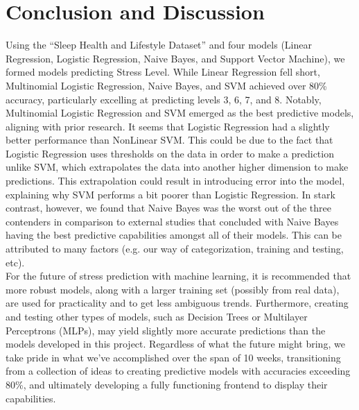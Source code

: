 \documentclass[11pt, letterpaper]{article}
\begin{document}
    \section*{Conclusion and Discussion}
    \noindent Using the “Sleep Health and Lifestyle Dataset” and four models (Linear Regression, Logistic Regression, Naive Bayes, and Support Vector Machine), we formed models predicting Stress Level. While Linear Regression fell short, Multinomial Logistic Regression, Naive Bayes, and SVM achieved over 80\% accuracy, particularly excelling at predicting levels 3, 6, 7, and 8. Notably, Multinomial Logistic Regression and SVM emerged as the best predictive models, aligning with prior research. It seems that Logistic Regression had a slightly better performance than NonLinear SVM. This could be due to the fact that Logistic Regression uses thresholds on the data in order to make a prediction unlike SVM, which extrapolates the data into another higher dimension to make predictions. This extrapolation could result in introducing error into the model, explaining why SVM performs a bit poorer than Logistic Regression. In stark contrast, however, we found that Naive Bayes was the worst out of the three contenders in comparison to external studies that concluded with Naive Bayes having the best predictive capabilities amongst all of their models. This can be attributed to many factors (e.g. our way of categorization, training and testing, etc).\\
    
    \noindent For the future of stress prediction with machine learning, it is recommended that more robust models, along with a larger training set (possibly from real data), are used for practicality and to get less ambiguous trends. Furthermore, creating and testing other types of models, such as Decision Trees or Multilayer Perceptrons (MLPs), may yield slightly more accurate predictions than the models developed in this project. Regardless of what the future might bring, we take pride in what we’ve accomplished over the span of 10 weeks, transitioning from a collection of ideas to creating predictive models with accuracies exceeding 80\%, and ultimately developing a fully functioning frontend to display their capabilities.
\end{document}
